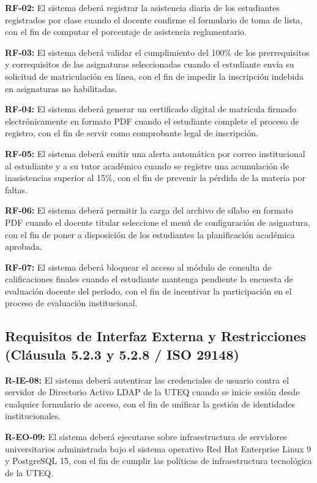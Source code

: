 \documentclass[conference]{IEEEtran}
\newcommand{\req}[1]{\noindent\textbf{#1:}\enspace}
\begin{document}
	\req{RF-02} El sistema deberá registrar la asistencia diaria de los estudiantes registrados por clase cuando el docente confirme el formulario de toma de lista, con el fin de computar el porcentaje de asistencia reglamentario.
	
	\req{RF-03} El sistema deberá validar el cumplimiento del 100\% de los prerrequisitos y correquisitos de las asignaturas seleccionadas cuando el estudiante envía su solicitud de matriculación en línea, con el fin de impedir la inscripción indebida en asignaturas no habilitadas.
	
	\req{RF-04} El sistema deberá generar un certificado digital de matrícula firmado electrónicamente en formato PDF cuando el estudiante complete el proceso de registro, con el fin de servir como comprobante legal de inscripción.
	
	\req{RF-05} El sistema deberá emitir una alerta automática por correo institucional al estudiante y a su tutor académico cuando se registre una acumulación de inasistencias superior al 15\%, con el fin de prevenir la pérdida de la materia por faltas.
	
	\req{RF-06} El sistema deberá permitir la carga del archivo de sílabo en formato PDF cuando el docente titular seleccione el menú de configuración de asignatura, con el fin de poner a disposición de los estudiantes la planificación académica aprobada.
	
	\req{RF-07} El sistema deberá bloquear el acceso al módulo de consulta de calificaciones finales cuando el estudiante mantenga pendiente la encuesta de evaluación docente del período, con el fin de incentivar la participación en el proceso de evaluación institucional.
	
	\subsection{Requisitos de Interfaz Externa y Restricciones (Cláusula 5.2.3 y 5.2.8 / ISO 29148)}
	\req{R-IE-08} El sistema deberá autenticar las credenciales de usuario contra el servidor de Directorio Activo LDAP de la UTEQ cuando se inicie sesión desde cualquier formulario de acceso, con el fin de unificar la gestión de identidades institucionales.
	
	\req{R-EO-09} El sistema deberá ejecutarse sobre infraestructura de servidores universitarios administrada bajo el sistema operativo Red Hat Enterprise Linux 9 y PostgreSQL 15, con el fin de cumplir las políticas de infraestructura tecnológica de la UTEQ.
	
\end{document}
